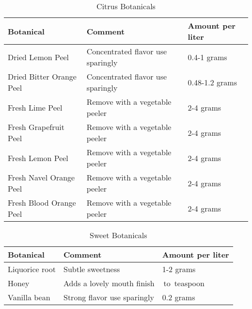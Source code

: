 \documentclass[letterpaper]{recipePMG}
\newcommand{\quarter}{\nicefrac{1}{4} \,}
\newcommand{\half}{\nicefrac{1}{2} \,}
\begin{document}
\begin{table}[H]
    \centering
    \caption{Citrus Botanicals}
    \begin{tabular}{@{}p{1.25in}p{3in}p{1.25in}@{}}
        \toprule
      Botanical &  Comment & Amount per liter \\
        \midrule
        Dried Lemon Peel & Concentrated flavor use sparingly & 0.4-1 grams\\
        Dried Bitter Orange Peel & Concentrated flavor  use sparingly & 0.48-1.2 grams\\
        Fresh Lime Peel & Remove with a vegetable peeler & 2-4 grams\\
        Fresh Grapefruit Peel & Remove with a vegetable peeler & 2-4 grams\\
        Fresh Lemon Peel & Remove with a vegetable peeler & 2-4 grams\\
        Fresh Navel Orange Peel & Remove with a vegetable peeler & 2-4 grams\\
        Fresh Blood Orange Peel & Remove with a vegetable peeler & 2-4 grams\\
        \bottomrule
    \end{tabular}
    \label{tab:citrus}
\end{table}

\begin{table}[H]
    \centering
    \caption{Sweet Botanicals}
    \begin{tabular}{@{}p{1.25in}p{3in}p{1.25in}@{}}
        \toprule
      Botanical &  Comment & Amount per liter \\
        \midrule
		Liquorice root & Subtle sweetness & 1-2 grams \\
		Honey & Adds a lovely mouth finish  & \quarter to \half teaspoon \\
		Vanilla bean & Strong flavor use sparingly & 0.2 grams \\
\end{tabular}
    \label{tab:sweet}
\end{table}
\end{document}
